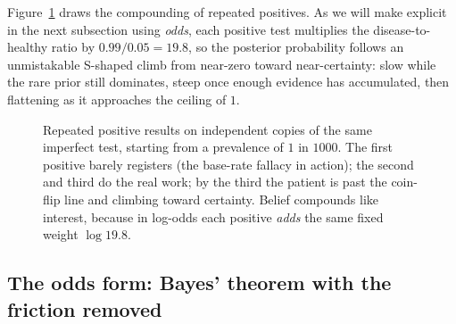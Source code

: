 Figure~\ref{ch05:fig-sequential} draws the compounding of repeated positives. As we will
make explicit in the next subsection using \emph{odds}, each positive test multiplies the
disease-to-healthy ratio by $0.99 / 0.05 = 19.8$, so the posterior probability follows an
unmistakable S-shaped climb from near-zero toward near-certainty: slow while the rare prior
still dominates, steep once enough evidence has accumulated, then flattening as it
approaches the ceiling of $1$.

\begin{figure}[H]
\centering
{}
\caption{Repeated positive results on independent copies of the same imperfect test,
starting from a prevalence of $1$ in $1000$. The first positive barely registers (the
base-rate fallacy in action); the second and third do the real work; by the third the
patient is past the coin-flip line and climbing toward certainty. Belief compounds like
interest, because in log-odds each positive \emph{adds} the same fixed weight
$\log 19.8$.}
\label{ch05:fig-sequential}
\end{figure}

\subsection{The odds form: Bayes' theorem with the friction removed}

